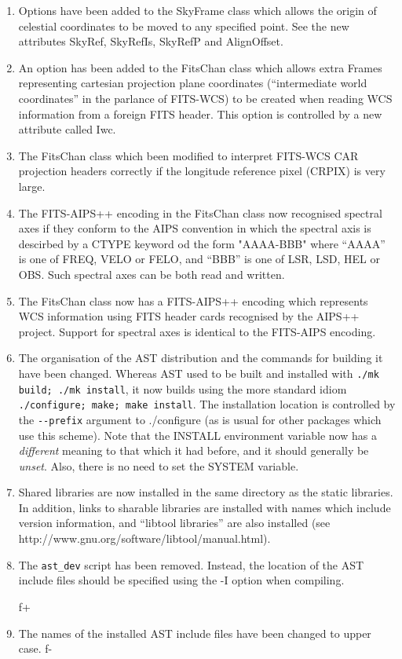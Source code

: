 \documentclass[twoside,11pt]{article}
\newcommand{\htmladdnormallink}[2]{#1}
\begin{document}
\begin{enumerate}

\item Options have been added to the SkyFrame class which allows the
origin
of celestial coordinates to be moved to any specified point. See the new
attributes SkyRef, SkyRefIs, SkyRefP and AlignOffset.

\item An option has been added to the FitsChan class which allows extra
Frames representing cartesian projection plane coordinates (``intermediate
world coordinates'' in the parlance of FITS-WCS) to be created when
reading
WCS information from a foreign FITS header. This option is controlled by
a new attribute called Iwc.

\item The FitsChan class which been modified to interpret FITS-WCS CAR
projection headers correctly if the longitude reference pixel (CRPIX) is
very large.

\item The  FITS-AIPS++ encoding in the FitsChan class now recognised
spectral axes if they conform to the AIPS convention in which the
spectral axis is descirbed by a CTYPE keyword od the form "AAAA-BBB"
where ``AAAA'' is one of FREQ, VELO or FELO, and ``BBB'' is one of LSR, LSD,
HEL or OBS. Such spectral axes can be both read and written.

\item The FitsChan class now has a FITS-AIPS++ encoding which represents
WCS information using FITS header cards recognised by the AIPS++ project.
Support for spectral axes is identical to the FITS-AIPS encoding.

\item The organisation of the AST distribution and the commands for
building it have been changed. Whereas AST used to be built and installed
with \verb+./mk build; ./mk install+, it now builds using the more standard
idiom \verb+./configure; make; make install+. The installation location is
controlled by the \verb+--prefix+ argument to ./configure (as is usual
for other packages which use this scheme).  Note that the INSTALL environment
variable now has a \emph{different} meaning to that which it had
before, and it should generally be \emph{unset}. Also, there is no need to
set the SYSTEM variable.

\item Shared libraries are now installed in the same directory as the
static libraries. In addition, links to sharable libraries are installed
with names which include version information, and ``libtool libraries''
are also installed (see \htmladdnormallink{http://www.gnu.org/software/libtool/manual.html}{
http://www.gnu.org/software/libtool/manual.html}).

\item The \verb+ast_dev+ script has been removed. Instead, the location of
the AST include files should be specified using the -I option when
compiling.

f+
\item The names of the installed AST include files have been changed to
upper case.
f-

\end{enumerate}
\end{document}
